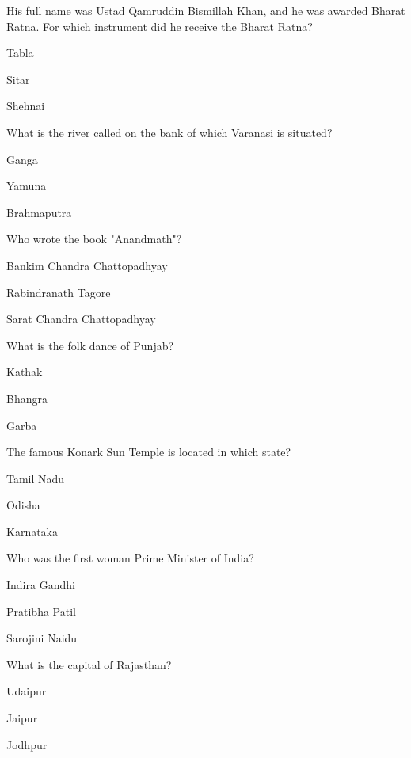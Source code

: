 
\begin{enhancedmcq}{His full name was Ustad Qamruddin Bismillah Khan, and he was awarded Bharat Ratna. For which instrument did he receive the Bharat Ratna?}
\item Tabla
\item Sitar
\item Shehnai

\end{enhancedmcq}
\begin{enhancedmcq}{What is the river called on the bank of which Varanasi is situated?}
\item Ganga
\item Yamuna
\item Brahmaputra

\end{enhancedmcq}
\begin{enhancedmcq}{Who wrote the book "Anandmath"?}
\item Bankim Chandra Chattopadhyay
\item Rabindranath Tagore
\item Sarat Chandra Chattopadhyay

\end{enhancedmcq}
\begin{enhancedmcq}{What is the folk dance of Punjab?}
\item Kathak
\item Bhangra
\item Garba

\end{enhancedmcq}
\begin{enhancedmcq}{The famous Konark Sun Temple is located in which state?}
\item Tamil Nadu
\item Odisha
\item Karnataka

\end{enhancedmcq}
\begin{enhancedmcq}{Who was the first woman Prime Minister of India?}
\item Indira Gandhi
\item Pratibha Patil
\item Sarojini Naidu

\end{enhancedmcq}
\begin{enhancedmcq}{What is the capital of Rajasthan?}
\item Udaipur
\item Jaipur
\item Jodhpur

\end{enhancedmcq}
